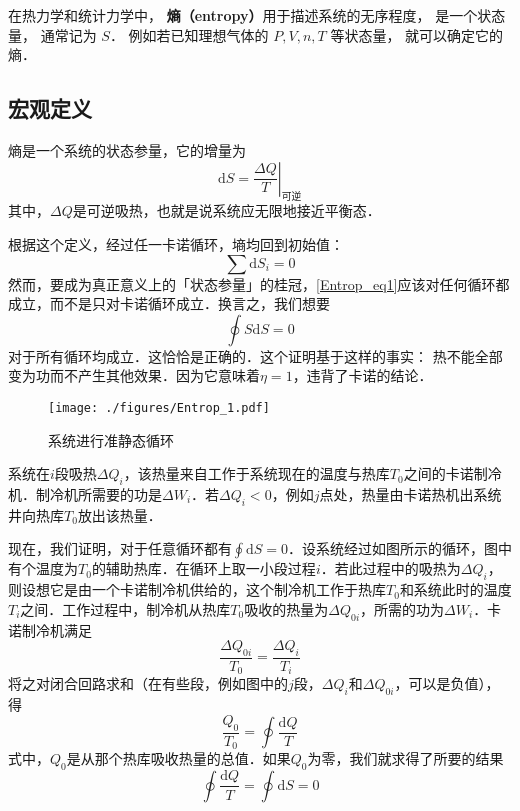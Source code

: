
在热力学和统计力学中， \textbf{熵（entropy）}用于描述系统的无序程度， 是一个状态量， 通常记为 $S$． 例如若已知理想气体的 $P, V, n, T$ 等状态量， 就可以确定它的熵． %

\subsection{宏观定义}

熵是一个系统的状态参量，它的增量为
\begin{equation}
\mathrm{d} S = \left . \frac{\Delta Q}{T}\right |_{\text{可逆}}
\end{equation}
其中，$\Delta Q$是可逆吸热，也就是说系统应无限地接近平衡态．

根据这个定义，经过任一卡诺循环，墒均回到初始值：
\begin{equation} \label{Entrop_eq1}
\sum{\text{d}S_i=0}
\end{equation}
然而，要成为真正意义上的「状态参量」的桂冠，\autoref{Entrop_eq1}应该对任何循环都成立，而不是只对卡诺循环成立．换言之，我们想要
\begin{equation}
\oint S \mathrm d S =0
\end{equation}
对于所有循环均成立．这恰恰是正确的．这个证明基于这样的事实： 热不能全部变为功而不产生其他效果．因为它意味着$\eta=1$，违背了卡诺的结论．

\begin{figure}[ht]
\centering
\texttt{[image: ./figures/Entrop\_1.pdf]}
\caption{系统进行准静态循环} \label{Entrop_fig1}
\end{figure}

系统在$i$段吸热$\Delta Q_i$，该热量来自工作于系统现在的温度与热库$T_0$之间的卡诺制冷机．制冷机所需要的功是$\Delta W_i$．若$\Delta Q_i<0$，例如$j$点处，热量由卡诺热机出系统井向热库$T_0$放出该热量．

现在，我们证明，对于任意循环都有$\oint \mathrm d S =0 $．设系统经过如图所示的循环，图中有个温度为$T_0$的辅助热库．在循环上取一小段过程$i$．若此过程中的吸热为$\Delta Q_i$，则设想它是由一个卡诺制冷机供给的，这个制冷机工作于热库$T_0$和系统此时的温度$T_i$之间．工作过程中，制冷机从热库$T_0$吸收的热量为$\Delta Q_{0i}$，所需的功为$\Delta W_i$．卡诺制冷机满足
\begin{equation}
\frac{\Delta Q_{0i}}{T_0}=\frac{\Delta Q_i}{T_i}
\end{equation}
将之对闭合回路求和（在有些段，例如图中的$j$段，$\Delta Q_i$和$\Delta Q_{0i}$，可以是负值），得
\begin{equation}
\frac{Q_0}{T_0}=\oint{\frac{\text{d}Q}{T}}
\end{equation}
式中，$Q_0$是从那个热库吸收热量的总值．如果$Q_0$为零，我们就求得了所要的结果
\begin{equation}
\oint{\frac{\text{d}Q}{T}=\oint{\text{d}S=0}}
\end{equation}

